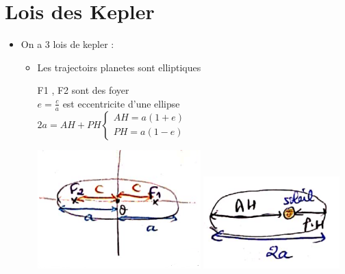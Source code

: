 \documentclass[12pt]{book}
\begin{document}
    \chapter{Lois des Kepler}
       \begin{itemize}
        \item  On a 3 lois de kepler :
            \begin{itemize}
                \item Les trajectoirs planetes sont elliptiques \\
                    \begin{minipage}{0.69\linewidth}
                        F1 , F2 sont des foyer \\
                        $ e = \frac{c}{a} $ est eccentricite d'une ellipse \\
                        $ 2a = AH + PH \begin{cases}
                            AH =a(1+e)\\
                            PH =a(1-e)
                        \end{cases} $
                    \end{minipage}
                    \begin{minipage}{0.22\linewidth}
                        \includegraphics[width=\linewidth]{pic/kepler1.png}
                        \includegraphics[width=\linewidth]{pic/kepler2.png}

\end{minipage}
\end{itemize}
\end{itemize}
\end{document}
